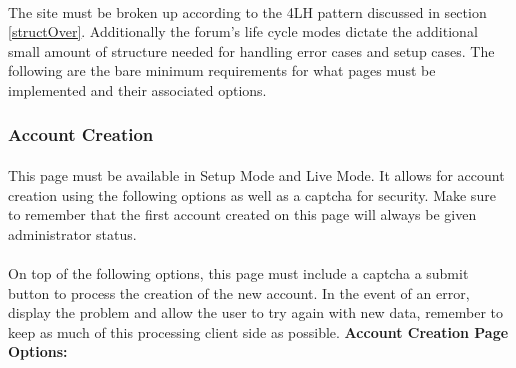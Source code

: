 \documentclass[]{article}
\begin{document}
\paragraph{}
The site must be broken up according to the 4LH pattern discussed in section \ref{structOver}. Additionally the forum's life cycle modes dictate the additional small amount of structure needed for handling error cases and setup cases. The following are the bare minimum requirements for what pages must be implemented and their associated options. 

\subsubsection{Account Creation}\label{AccPage}
\paragraph{}
This page must be available in Setup Mode and Live Mode. It allows for account creation using the following options as well as a captcha for security. Make sure to remember that the first account created on this page will always be given administrator status.
\paragraph{}
On top of the following options, this page must include a captcha a submit button to process the creation of the new account. In the event of an error, display the problem and allow the user to try again with new data, remember to keep as much of this processing client side as possible.
\newpage
\textbf{Account Creation Page Options:}
\end{document}
